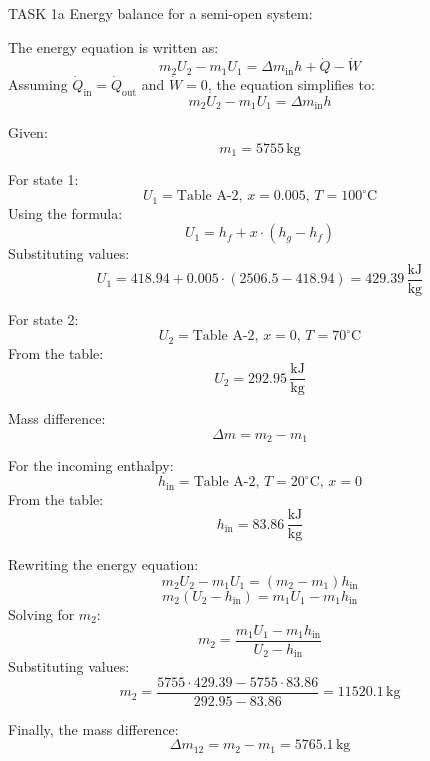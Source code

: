 TASK 1a  
Energy balance for a semi-open system:  

The energy equation is written as:  
\[
m_2 U_2 - m_1 U_1 = \Delta m_{\text{in}} h + \dot{Q} - \dot{W}
\]  
Assuming \( \dot{Q}_{\text{in}} = \dot{Q}_{\text{out}} \) and \( \dot{W} = 0 \), the equation simplifies to:  
\[
m_2 U_2 - m_1 U_1 = \Delta m_{\text{in}} h
\]  

Given:  
\[
m_1 = 5755 \, \text{kg}
\]  

For state 1:  
\[
U_1 = \text{Table A-2}, \, x = 0.005, \, T = 100^\circ\text{C}
\]  
Using the formula:  
\[
U_1 = h_f + x \cdot (h_g - h_f)
\]  
Substituting values:  
\[
U_1 = 418.94 + 0.005 \cdot (2506.5 - 418.94) = 429.39 \, \frac{\text{kJ}}{\text{kg}}
\]  

For state 2:  
\[
U_2 = \text{Table A-2}, \, x = 0, \, T = 70^\circ\text{C}
\]  
From the table:  
\[
U_2 = 292.95 \, \frac{\text{kJ}}{\text{kg}}
\]  

Mass difference:  
\[
\Delta m = m_2 - m_1
\]  

For the incoming enthalpy:  
\[
h_{\text{in}} = \text{Table A-2}, \, T = 20^\circ\text{C}, \, x = 0
\]  
From the table:  
\[
h_{\text{in}} = 83.86 \, \frac{\text{kJ}}{\text{kg}}
\]  

Rewriting the energy equation:  
\[
m_2 U_2 - m_1 U_1 = (m_2 - m_1) h_{\text{in}}
\]  
\[
m_2 (U_2 - h_{\text{in}}) = m_1 U_1 - m_1 h_{\text{in}}
\]  
Solving for \( m_2 \):  
\[
m_2 = \frac{m_1 U_1 - m_1 h_{\text{in}}}{U_2 - h_{\text{in}}}
\]  
Substituting values:  
\[
m_2 = \frac{5755 \cdot 429.39 - 5755 \cdot 83.86}{292.95 - 83.86} = 11520.1 \, \text{kg}
\]  

Finally, the mass difference:  
\[
\Delta m_{12} = m_2 - m_1 = 5765.1 \, \text{kg}
\]